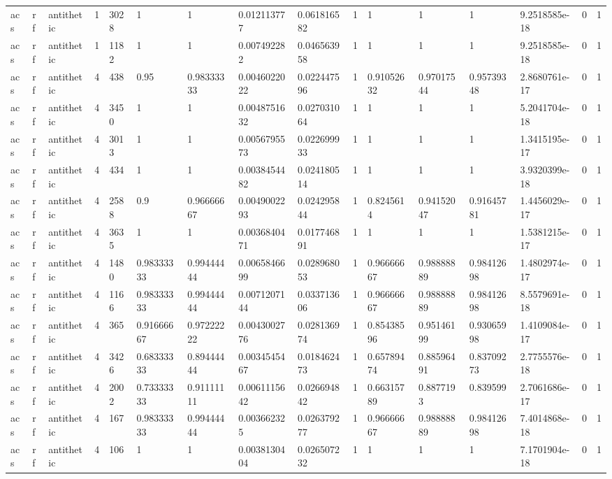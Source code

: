 \begin{tabular}{llllllllllllllll}
acs & rf & antithetic & 1 & 3028 & 1 & 1 & 0.012113777 & 0.061816582 & 1 & 1 & 1 & 1 & 9.2518585e-18 & 0 & 1 \\
acs & rf & antithetic & 1 & 1182 & 1 & 1 & 0.007492282 & 0.046563958 & 1 & 1 & 1 & 1 & 9.2518585e-18 & 0 & 1 \\
acs & rf & antithetic & 4 & 438 & 0.95 & 0.98333333 & 0.0046022022 & 0.022447596 & 1 & 0.91052632 & 0.97017544 & 0.95739348 & 2.8680761e-17 & 0 & 1 \\
acs & rf & antithetic & 4 & 3450 & 1 & 1 & 0.0048751632 & 0.027031064 & 1 & 1 & 1 & 1 & 5.2041704e-18 & 0 & 1 \\
acs & rf & antithetic & 4 & 3013 & 1 & 1 & 0.0056795573 & 0.022699933 & 1 & 1 & 1 & 1 & 1.3415195e-17 & 0 & 1 \\
acs & rf & antithetic & 4 & 434 & 1 & 1 & 0.0038454482 & 0.024180514 & 1 & 1 & 1 & 1 & 3.9320399e-18 & 0 & 1 \\
acs & rf & antithetic & 4 & 2588 & 0.9 & 0.96666667 & 0.0049002293 & 0.024295844 & 1 & 0.8245614 & 0.94152047 & 0.91645781 & 1.4456029e-17 & 0 & 1 \\
acs & rf & antithetic & 4 & 3635 & 1 & 1 & 0.0036840471 & 0.017746891 & 1 & 1 & 1 & 1 & 1.5381215e-17 & 0 & 1 \\
acs & rf & antithetic & 4 & 1480 & 0.98333333 & 0.99444444 & 0.0065846699 & 0.028968053 & 1 & 0.96666667 & 0.98888889 & 0.98412698 & 1.4802974e-17 & 0 & 1 \\
acs & rf & antithetic & 4 & 1166 & 0.98333333 & 0.99444444 & 0.0071207144 & 0.033713606 & 1 & 0.96666667 & 0.98888889 & 0.98412698 & 8.5579691e-18 & 0 & 1 \\
acs & rf & antithetic & 4 & 365 & 0.91666667 & 0.97222222 & 0.0043002776 & 0.028136974 & 1 & 0.85438596 & 0.95146199 & 0.93065998 & 1.4109084e-17 & 0 & 1 \\
acs & rf & antithetic & 4 & 3426 & 0.68333333 & 0.89444444 & 0.0034545467 & 0.018462473 & 1 & 0.65789474 & 0.88596491 & 0.83709273 & 2.7755576e-18 & 0 & 1 \\
acs & rf & antithetic & 4 & 2002 & 0.73333333 & 0.91111111 & 0.0061115642 & 0.026694842 & 1 & 0.66315789 & 0.8877193 & 0.839599 & 2.7061686e-17 & 0 & 1 \\
acs & rf & antithetic & 4 & 167 & 0.98333333 & 0.99444444 & 0.003662325 & 0.026379277 & 1 & 0.96666667 & 0.98888889 & 0.98412698 & 7.4014868e-18 & 0 & 1 \\
acs & rf & antithetic & 4 & 106 & 1 & 1 & 0.0038130404 & 0.026507232 & 1 & 1 & 1 & 1 & 7.1701904e-18 & 0 & 1 \\

\end{tabular}
